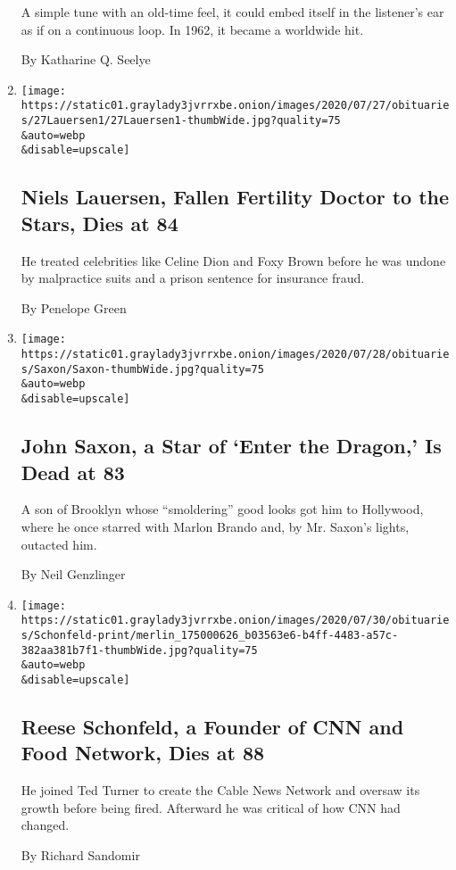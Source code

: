 \begin{enumerate}
  A simple tune with an old-time feel, it could embed itself in the
  listener's ear as if on a continuous loop. In 1962, it became a
  worldwide hit.

  By Katharine Q. Seelye
\item
  \href{/2020/07/28/nyregion/niels-h-lauersen-dead.html}{}

  \texttt{[image: https://static01.graylady3jvrrxbe.onion/images/2020/07/27/obituaries/27Lauersen1/27Lauersen1-thumbWide.jpg?quality=75\\\&auto=webp\\\&disable=upscale]}

  \hypertarget{niels-lauersen-fallen-fertility-doctor-to-the-stars-dies-at-84}{%
  \subsection{Niels Lauersen, Fallen Fertility Doctor to the Stars, Dies
  at
  84}\label{niels-lauersen-fallen-fertility-doctor-to-the-stars-dies-at-84}}

  He treated celebrities like Celine Dion and Foxy Brown before he was
  undone by malpractice suits and a prison sentence for insurance fraud.

  By Penelope Green
\item
  \href{/2020/07/28/arts/television/john-saxon-dead.html}{}

  \texttt{[image: https://static01.graylady3jvrrxbe.onion/images/2020/07/28/obituaries/Saxon/Saxon-thumbWide.jpg?quality=75\\\&auto=webp\\\&disable=upscale]}

  \hypertarget{john-saxon-a-star-of-enter-the-dragon-is-dead-at-83}{%
  \subsection{John Saxon, a Star of `Enter the Dragon,' Is Dead at
  83}\label{john-saxon-a-star-of-enter-the-dragon-is-dead-at-83}}

  A son of Brooklyn whose ``smoldering'' good looks got him to
  Hollywood, where he once starred with Marlon Brando and, by Mr.
  Saxon's lights, outacted him.

  By Neil Genzlinger
\item
  \href{/2020/07/28/business/media/reese-schonfeld-a-founder-of-cnn-and-food-network-dies-at-88.html}{}

  \texttt{[image: https://static01.graylady3jvrrxbe.onion/images/2020/07/30/obituaries/Schonfeld-print/merlin\_175000626\_b03563e6-b4ff-4483-a57c-382aa381b7f1-thumbWide.jpg?quality=75\\\&auto=webp\\\&disable=upscale]}

  \hypertarget{reese-schonfeld-a-founder-of-cnn-and-food-network-dies-at-88}{%
  \subsection{Reese Schonfeld, a Founder of CNN and Food Network, Dies
  at
  88}\label{reese-schonfeld-a-founder-of-cnn-and-food-network-dies-at-88}}

  He joined Ted Turner to create the Cable News Network and oversaw its
  growth before being fired. Afterward he was critical of how CNN had
  changed.

  By Richard Sandomir
\end{enumerate}

